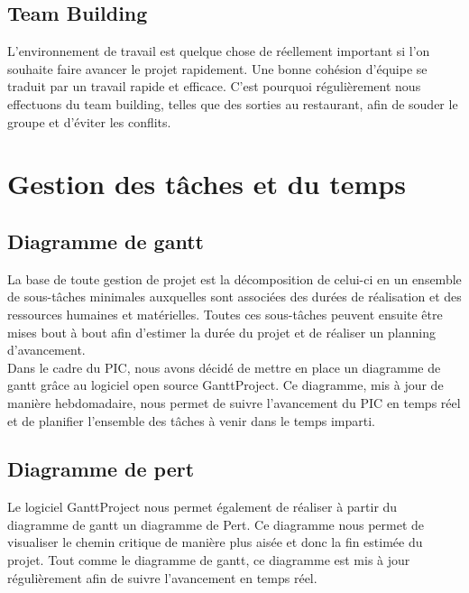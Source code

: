 \documentclass[asi]{picInsa}
\begin{document}
\subsection{Team Building}
L'environnement de travail est quelque chose de réellement important si l'on souhaite faire avancer le projet rapidement. Une bonne cohésion d'équipe se traduit par un travail rapide et efficace. C'est pourquoi régulièrement nous effectuons du team building, telles que des sorties au restaurant, afin de souder le groupe et d'éviter les conflits.



\section{Gestion des tâches et du temps}
\subsection{Diagramme de gantt}
La base de toute gestion de projet est la décomposition de celui-ci en un ensemble de sous-tâches minimales auxquelles sont associées des durées de réalisation et des ressources humaines et matérielles. Toutes ces sous-tâches peuvent ensuite être mises bout à bout afin d'estimer la durée du projet et de réaliser un planning d'avancement.\\
Dans le cadre du PIC, nous avons décidé de mettre en place un diagramme de gantt grâce au logiciel open source GanttProject. Ce diagramme, mis à jour de manière hebdomadaire, nous permet de suivre l'avancement du PIC en temps réel et de planifier l'ensemble des tâches à venir dans le temps imparti.

\subsection{Diagramme de pert}
Le logiciel GanttProject nous permet également de réaliser à partir du diagramme de gantt un diagramme de Pert. Ce diagramme nous permet de visualiser le chemin critique de manière plus aisée et donc la fin estimée du projet. Tout comme le diagramme de gantt, ce diagramme est mis à jour régulièrement afin de suivre l'avancement en temps réel.
\end{document}
